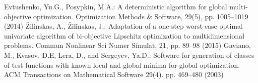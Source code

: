 \documentclass[smallextended]{svjour3}       %
\begin{document}
\begin{thebibliography}{}
 Evtushenko, Yu.G., Posypkin, M.A.: A deterministic algorithm for global multi-objective optimization. Optimization Methods \& Software, 29(5), pp. 1005--1019 (2014)
 {\v Z}ilinskas, A., {\v Z}ilinskas, J.: Adaptation of a one-step worst-case optimal univariate algorithm of bi-objective Lipschitz optimization to multidimensional problems. Commun Nonlinear Sci Numer Simulat, 21, pp. 89--98 (2015)
 Gaviano, M., Kvasov, D.E, Lera, D., and Sergeyev, Ya.D.: Software for generation of classes of test functions with known local and global minima for global optimization. ACM Transactions on Mathematical Software 29(4). pp. 469--480 (2003)

\end{thebibliography}
\end{document}
